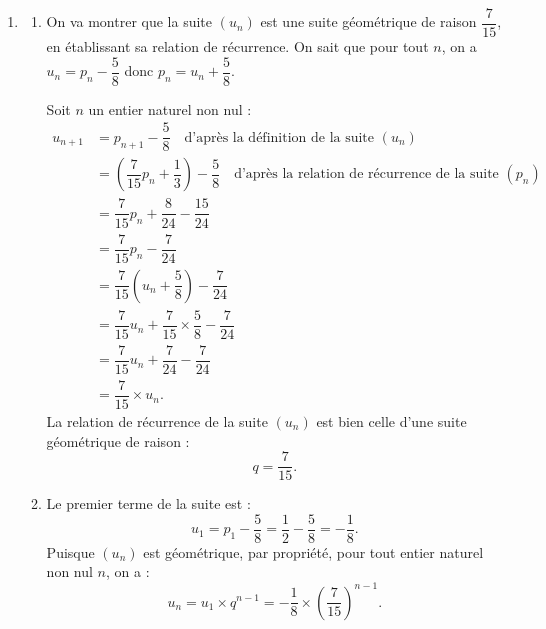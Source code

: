\begin{enumerate}
Les événements $T_n$ et $\overline{T_n}$ partitionnent l'univers, donc, d'après la loi des probabilités totales :
\[
\begin{aligned}
p_{n+1}=P(T_{n+1})&=P(T_n\cap T_{n+1})+P(\overline{T_n}\cap T_{n+1})\\
&=P(T_n)\times P_{T_n}(T_{n+1})+P(\overline{T_n})\times P_{\overline{T_n}}(T_{n+1})
\end{aligned}
\]
\[
\begin{aligned}
p_{n+1}&=p_n\times \dfrac45+(1-p_n)\times \dfrac13\\
&=p_n\times \dfrac45+\dfrac13-p_n\times \dfrac13\\
&=p_n\times \left(\dfrac45-\dfrac13\right)+\dfrac13\\
&=\dfrac7{15}p_n+\dfrac13.
\end{aligned}
\]
On a bien établi la relation de récurrence de la suite $(p_n)$.

\item \begin{enumerate}
\item On va montrer que la suite $(u_n)$ est une suite géométrique de raison $\dfrac7{15}$, en établissant sa relation de récurrence. On sait que pour tout $n$, on a $u_n=p_n-\dfrac58$ donc $p_n=u_n+\dfrac58$.

Soit $n$ un entier naturel non nul :
\[
\begin{aligned}
u_{n+1}&=p_{n+1}-\dfrac58 \quad \text{d'après la définition de la suite }(u_n)\\
&=\left(\dfrac7{15}p_n+\dfrac13\right)-\dfrac58 \quad \text{d'après la relation de récurrence de la suite }(p_n)\\
&=\dfrac7{15}p_n+\dfrac8{24}-\dfrac{15}{24}\\
&=\dfrac7{15}p_n-\dfrac7{24}\\
&=\dfrac7{15}\left(u_n+\dfrac58\right)-\dfrac7{24}\\
&=\dfrac7{15}u_n+\dfrac7{15}\times \dfrac58-\dfrac7{24}\\
&=\dfrac7{15}u_n+\dfrac7{24}-\dfrac7{24}\\
&=\dfrac7{15}\times u_n.
\end{aligned}
\]
La relation de récurrence de la suite $(u_n)$ est bien celle d'une suite géométrique de raison :
\[
q=\dfrac7{15}.
\]

\item Le premier terme de la suite est :
\[
u_1=p_1-\dfrac58=\dfrac12-\dfrac58=-\dfrac18.
\]
Puisque $(u_n)$ est géométrique, par propriété, pour tout entier naturel non nul $n$, on a :
\[
u_n=u_1\times q^{n-1}=-\dfrac18\times \left(\dfrac7{15}\right)^{n-1}.
\]


\end{enumerate}
\end{enumerate}
